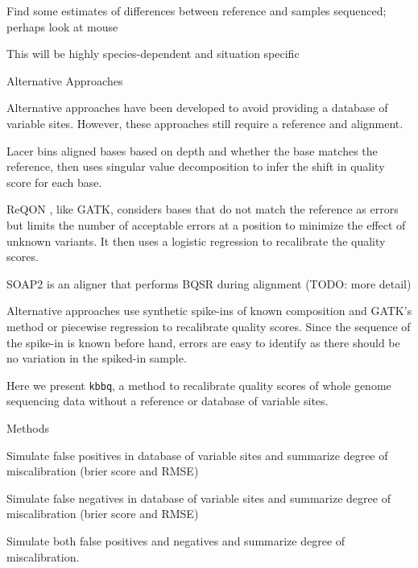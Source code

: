 \documentclass{article}
\begin{document}
\begin{outline}
\begin{outline}
			\begin{outline}
				\item Find some estimates of differences between reference and samples sequenced; perhaps look at mouse
				\item This will be highly species-dependent and situation specific
			\end{outline}
		\item Alternative Approaches
			\begin{outline}
			\item Alternative approaches have been developed to avoid providing a database of variable sites. However, these approaches still require a reference and alignment.
			\item Lacer \parencite{chung_lacer:_2017} bins aligned bases based on depth and whether the base matches the reference, then uses singular value decomposition to infer the shift in quality score for each base.
			\item ReQON \parencite{cabanski_reqon:_2012}, like GATK, considers bases that do not match the reference as errors but limits the number of acceptable errors at a position to minimize the effect of unknown variants. It then uses a logistic regression to recalibrate the quality scores.
			\item SOAP2 \parencite{li_soap2:_2009} is an aligner that performs BQSR during alignment (TODO: more detail)
			\item Alternative approaches use synthetic spike-ins of known composition and GATK's method \parencite{zook_synthetic_2012} or piecewise regression \parencite{ni_improvement_2016} to recalibrate quality scores. Since the sequence of the spike-in is known before hand, errors are easy to identify as there should be no variation in the spiked-in sample.
			\end{outline}
		\item Here we present \texttt{kbbq}, a method to recalibrate quality scores of whole genome sequencing data without a reference or database of variable sites.
	\end{outline}
	\item Methods
	\begin{outline}
		\item Simulate false positives in database of variable sites and summarize degree of miscalibration (brier score and RMSE)
		\item Simulate false negatives in database of variable sites and summarize degree of miscalibration (brier score and RMSE)
		\item Simulate both false positives and negatives and summarize degree of miscalibration.

\end{outline}
\end{outline}
\end{document}
